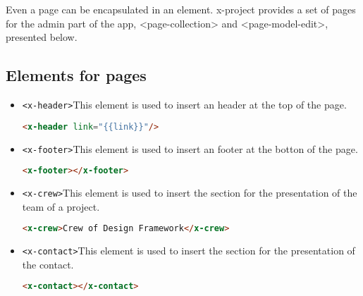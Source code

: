 Even a page can be encapsulated in an element. x-project provides a set of pages for the admin part of the app, <page-collection> and <page-model-edit>, presented below.

\subsection{Elements for pages}

\begin{itemize}
\item \texttt{<x-header>}This element is used to insert an header at the top of the page.
\begin{lstlisting}[language=html]
<x-header link="{{link}}"/>
\end{lstlisting}
\item \texttt{<x-footer>}This element is used to insert an footer at the botton of the page.
\begin{lstlisting}[language=html]
<x-footer></x-footer>
\end{lstlisting}
\item \texttt{<x-crew>}This element is used to insert the section for the presentation of the team of a project.
\begin{lstlisting}[language=html]
<x-crew>Crew of Design Framework</x-crew>\end{lstlisting}
\item \texttt{<x-contact>}This element is used to insert the section for the presentation of the contact.
\begin{lstlisting}[language=html]
<x-contact></x-contact>\end{lstlisting}
\end{itemize}
